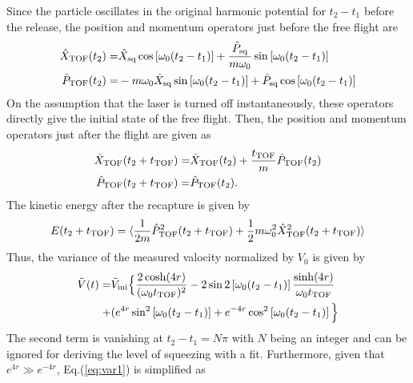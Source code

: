 \documentclass[aps, prl, 
amsmath, showpacs, preprintnumbers, twocolumn, amssymb, amsmath, superscriptaddress]{revtex4-1}
\begin{document}
Since the particle oscillates in the original harmonic potential for $t_2-t_1$ before the release, the position and momentum operators just before the free flight are
\begin{eqnarray}
\hat{X}_{\rm TOF} (t_2 )=&\hat{X}_{\rm sq} \cos \left[ \omega_0 (t_2-t_1) \right] + \dfrac{\hat{P}_{\rm sq}}{m\omega_0} \sin \left[ \omega_0 (t_2-t_1) \right] \\
\hat{P}_{\rm TOF} (t_2 )=&-m\omega_0 \hat{X}_{\rm sq} \sin \left[ \omega_0 (t_2-t_1) \right] + \hat{P}_{\rm sq} \cos \left[ \omega_0 (t_2-t_1) \right]
\end{eqnarray}
On the assumption that the laser is turned off instantaneously, these operators directly give the initial state of the free flight. Then, the position and momentum operators just after the flight are given as
\begin{eqnarray}
\hat{X}_{\rm TOF} (t_2+t_{\rm TOF} )=&\hat{X}_{\rm TOF} (t_2 )+\dfrac{t_{\rm TOF}}{m} \hat{P}_{\rm TOF}(t_2) \\
\hat{P}_{\rm TOF}(t_2+t_{\rm TOF})=&\hat{P}_{\rm TOF}(t_2).
\end{eqnarray}
The kinetic energy after the recapture is given by
\begin{eqnarray}
E(t_2+t_{\rm TOF}) = \langle \dfrac{1}{2m}\hat{P}_{\rm TOF}^2 (t_2+t_{\rm TOF}) +\dfrac{1}{2}m\omega_0^2 \hat{X}_{\rm TOF}^2 (t_2+t_{\rm TOF} ) \rangle
\end{eqnarray}
Thus, the variance of the measured valocity normalized by $V_0$ is given by
\begin{eqnarray}
\tilde{V}(t)  =& \tilde{V}_{\rm ini} \Big\{ \dfrac{2\cosh(4r)}{(\omega_0  t_{\rm TOF})^2} - 2 \sin 2\left[ \omega_0 (t_2-t_1) \right] \dfrac{\sinh (4r)}{\omega_0 t_{\rm TOF} } \notag \\ 
 +& (e^{4r} \sin^2 \left[ \omega_0 (t_2-t_1) \right] +e^{-4r}  \cos^2 \left[ \omega_0 (t_2-t_1)  \right] \Big\}
\label{eq:var1}
\end{eqnarray}
The second term is vanishing at $t_2-t_1=N \pi $ with $N$ being an integer and can be ignored for deriving the level of squeezing with a fit. Furthermore, given that $e^{4r} \gg e^{-4r}$, Eq.(\ref{eq:var1}) is simplified as 
\end{document}
